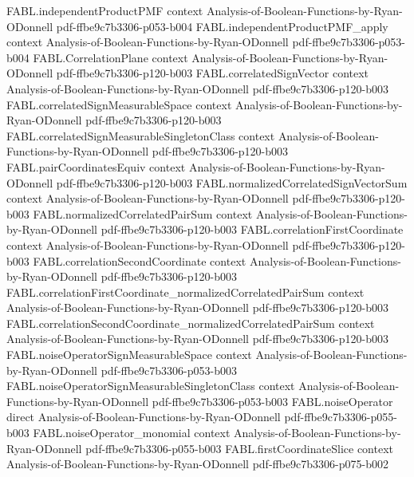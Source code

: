 \begin{theorem}
\proofstep
  {FABL.independentProductPMF}
  {context}
  {Analysis-of-Boolean-Functions-by-Ryan-ODonnell}
  {pdf-ffbe9c7b3306-p053-b004}
\proofstep
  {FABL.independentProductPMF_apply}
  {context}
  {Analysis-of-Boolean-Functions-by-Ryan-ODonnell}
  {pdf-ffbe9c7b3306-p053-b004}
\proofstep
  {FABL.CorrelationPlane}
  {context}
  {Analysis-of-Boolean-Functions-by-Ryan-ODonnell}
  {pdf-ffbe9c7b3306-p120-b003}
\proofstep
  {FABL.correlatedSignVector}
  {context}
  {Analysis-of-Boolean-Functions-by-Ryan-ODonnell}
  {pdf-ffbe9c7b3306-p120-b003}
\proofstep
  {FABL.correlatedSignMeasurableSpace}
  {context}
  {Analysis-of-Boolean-Functions-by-Ryan-ODonnell}
  {pdf-ffbe9c7b3306-p120-b003}
\proofstep
  {FABL.correlatedSignMeasurableSingletonClass}
  {context}
  {Analysis-of-Boolean-Functions-by-Ryan-ODonnell}
  {pdf-ffbe9c7b3306-p120-b003}
\proofstep
  {FABL.pairCoordinatesEquiv}
  {context}
  {Analysis-of-Boolean-Functions-by-Ryan-ODonnell}
  {pdf-ffbe9c7b3306-p120-b003}
\proofstep
  {FABL.normalizedCorrelatedSignVectorSum}
  {context}
  {Analysis-of-Boolean-Functions-by-Ryan-ODonnell}
  {pdf-ffbe9c7b3306-p120-b003}
\proofstep
  {FABL.normalizedCorrelatedPairSum}
  {context}
  {Analysis-of-Boolean-Functions-by-Ryan-ODonnell}
  {pdf-ffbe9c7b3306-p120-b003}
\proofstep
  {FABL.correlationFirstCoordinate}
  {context}
  {Analysis-of-Boolean-Functions-by-Ryan-ODonnell}
  {pdf-ffbe9c7b3306-p120-b003}
\proofstep
  {FABL.correlationSecondCoordinate}
  {context}
  {Analysis-of-Boolean-Functions-by-Ryan-ODonnell}
  {pdf-ffbe9c7b3306-p120-b003}
\proofstep
  {FABL.correlationFirstCoordinate_normalizedCorrelatedPairSum}
  {context}
  {Analysis-of-Boolean-Functions-by-Ryan-ODonnell}
  {pdf-ffbe9c7b3306-p120-b003}
\proofstep
  {FABL.correlationSecondCoordinate_normalizedCorrelatedPairSum}
  {context}
  {Analysis-of-Boolean-Functions-by-Ryan-ODonnell}
  {pdf-ffbe9c7b3306-p120-b003}
\proofstep
  {FABL.noiseOperatorSignMeasurableSpace}
  {context}
  {Analysis-of-Boolean-Functions-by-Ryan-ODonnell}
  {pdf-ffbe9c7b3306-p053-b003}
\proofstep
  {FABL.noiseOperatorSignMeasurableSingletonClass}
  {context}
  {Analysis-of-Boolean-Functions-by-Ryan-ODonnell}
  {pdf-ffbe9c7b3306-p053-b003}
\proofstep
  {FABL.noiseOperator}
  {direct}
  {Analysis-of-Boolean-Functions-by-Ryan-ODonnell}
  {pdf-ffbe9c7b3306-p055-b003}
\proofstep
  {FABL.noiseOperator_monomial}
  {context}
  {Analysis-of-Boolean-Functions-by-Ryan-ODonnell}
  {pdf-ffbe9c7b3306-p055-b003}
\proofstep
  {FABL.firstCoordinateSlice}
  {context}
  {Analysis-of-Boolean-Functions-by-Ryan-ODonnell}
  {pdf-ffbe9c7b3306-p075-b002}
\proofstep

\end{theorem}
